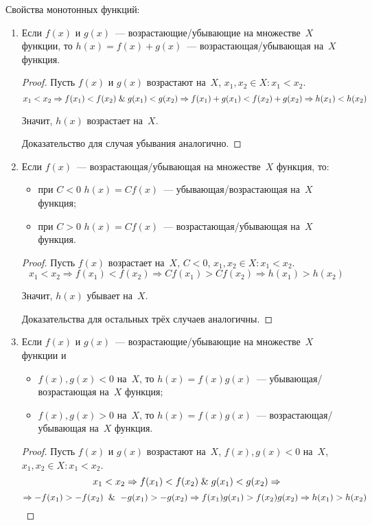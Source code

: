 Свойства монотонных функций:
\begin{enumerate}
	\item Если $f(x)$ и $g(x)$~--- возрастающие/убывающие на множестве~$X$ функции, то $h(x) = f(x) + g(x)$~--- воз\-ра\-ста\-ющ\-ая/убывающая на~$X$ функция.
	\begin{proof}
	Пусть $f(x)$ и $g(x)$ возрастают на~$X$, $x_1, x_2 \in X \colon x_1 < x_2$.
	\begin{equation*}
	x_1 < x_2 \Rightarrow
	f(x_1) < f(x_2) \mathrel{\&} g(x_1) < g(x_2) \Rightarrow
	f(x_1) + g(x_1) < f(x_2) + g(x_2) \Rightarrow
	h(x_1) < h(x_2)
	\end{equation*}
	
	Значит, $h(x)$ возрастает на~$X$.
	
	Доказательство для случая убывания аналогично.
	\end{proof}
	
	\item Если $f(x)$~--- возрастающая/убывающая на множестве~$X$ функция, то:
	\begin{itemize}
		\item при $C < 0$ $h(x) = Cf(x)$~--- убывающая/возрастающая на~$X$ функция;
		\item при $C > 0$ $h(x) = Cf(x)$~--- возрастающая/убывающая на~$X$ функция.
	\end{itemize}
	\begin{proof}
	Пусть $f(x)$ возрастает на~$X$, $C < 0$, $x_1, x_2 \in X \colon x_1 < x_2$.
	\begin{equation*}
	x_1 < x_2 \Rightarrow
	f(x_1) < f(x_2) \Rightarrow
	C f(x_1) > C f(x_2) \Rightarrow
	h(x_1) > h(x_2)
	\end{equation*}
	
	Значит, $h(x)$ убывает на~$X$.
	
	Доказательства для остальных трёх случаев аналогичны.
	\end{proof}
	
	\item Если $f(x)$ и $g(x)$~--- возрастающие/убывающие на множестве~$X$ функции и
	\begin{itemize}
		\item $f(x), g(x) < 0$ на~$X$, то $h(x) = f(x)g(x)$~--- убывающая/возрастающая на~$X$ функция;
		\item $f(x), g(x) > 0$ на~$X$, то $h(x) = f(x)g(x)$~--- возрастающая/убывающая на~$X$ функция.
	\end{itemize}
	\begin{proof}
	Пусть $f(x)$ и $g(x)$ возрастают на~$X$, $f(x), g(x) < 0$ на~$X$, $x_1, x_2 \in X \colon x_1 < x_2$.
	\begin{equation*}
	x_1 < x_2 \Rightarrow
	f(x_1) < f(x_2) \mathrel{\&} g(x_1) < g(x_2) \Rightarrow
	\end{equation*}
	\begin{equation*}
	\Rightarrow -f(x_1) > -f(x_2) \And -g(x_1) > -g(x_2) \Rightarrow
	f(x_1)g(x_1) > f(x_2)g(x_2) \Rightarrow
	h(x_1) > h(x_2)
	\end{equation*}
	

\end{proof}
\end{enumerate}

